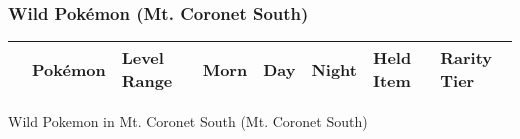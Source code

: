\subsubsection{Wild Pokémon (Mt. Coronet South)}%
\label{ssubsec:WildPokmon(Mt.CoronetSouth)}%
\begin{longtable}{||l l l l l l l l||}%
\hline%
\rowcolor{gray}%
&Pokémon&Level Range&Morn&Day&Night&Held Item&Rarity Tier\\%
\hline%
\endhead%
\hline%
\end{longtable}%
\caption{Wild Pokemon in Mt. Coronet South (Mt. Coronet South)}